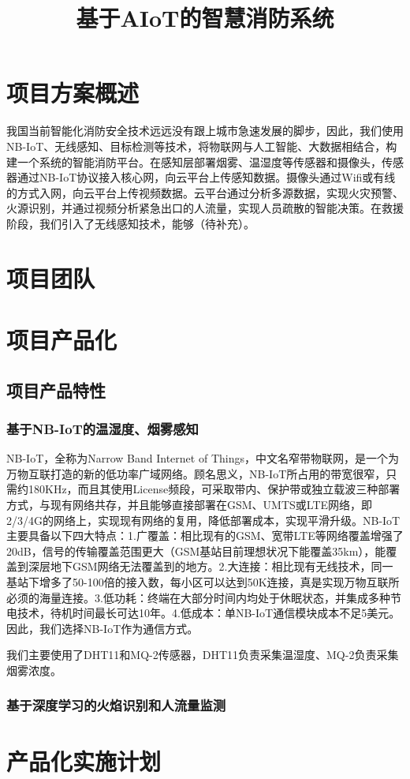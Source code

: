 \documentclass{ctexart}
\begin{document}
	\title{基于AIoT的智慧消防系统}
	\section{项目方案概述}
	我国当前智能化消防安全技术远远没有跟上城市急速发展的脚步，因此，我们使用NB-IoT、无线感知、目标检测等技术，将物联网与人工智能、大数据相结合，构建一个系统的智能消防平台。在感知层部署烟雾、温湿度等传感器和摄像头，传感器通过NB-IoT协议接入核心网，向云平台上传感知数据。摄像头通过Wifi或有线的方式入网，向云平台上传视频数据。云平台通过分析多源数据，实现火灾预警、火源识别，并通过视频分析紧急出口的人流量，实现人员疏散的智能决策。在救援阶段，我们引入了无线感知技术，能够（待补充）。
	\section{项目团队}
	\section{项目产品化}
		\subsection{项目产品特性}
			\subsubsection{基于NB-IoT的温湿度、烟雾感知}
			NB-IoT，全称为Narrow Band Internet of Things，中文名窄带物联网，是一个为万物互联打造的新的低功率广域网络。顾名思义，NB-IoT所占用的带宽很窄，只需约180KHz，而且其使用License频段，可采取带内、保护带或独立载波三种部署方式，与现有网络共存，并且能够直接部署在GSM、UMTS或LTE网络，即2/3/4G的网络上，实现现有网络的复用，降低部署成本，实现平滑升级。NB-IoT主要具备以下四大特点：1.广覆盖：相比现有的GSM、宽带LTE等网络覆盖增强了20dB，信号的传输覆盖范围更大（GSM基站目前理想状况下能覆盖35km），能覆盖到深层地下GSM网络无法覆盖到的地方。2.大连接：相比现有无线技术，同一基站下增多了50-100倍的接入数，每小区可以达到50K连接，真是实现万物互联所必须的海量连接。3.低功耗：终端在大部分时间内均处于休眠状态，并集成多种节电技术，待机时间最长可达10年。4.低成本：单NB-IoT通信模块成本不足5美元。因此，我们选择NB-IoT作为通信方式。\par
			我们主要使用了DHT11和MQ-2传感器，DHT11负责采集温湿度、MQ-2负责采集烟雾浓度。
			\subsubsection{基于深度学习的火焰识别和人流量监测}
	\section{产品化实施计划}
\end{document}
